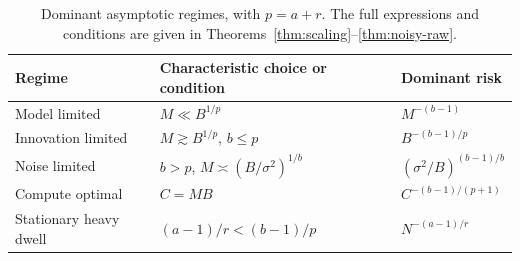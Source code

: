 \begin{table}[t]
\centering
\footnotesize
\caption{Dominant asymptotic regimes, with $p=a+r$.  The full expressions and
conditions are given in Theorems~\ref{thm:scaling}--\ref{thm:noisy-raw}.}
\label{tab:regimes}
\setlength{\tabcolsep}{1.5pt}%
\begin{tabular}{@{}lp{}p{}@{}}
\toprule
Regime & Characteristic choice or condition & Dominant risk \\
\midrule
Model limited & $M\ll B^{1/p}$ & $M^{-(b-1)}$ \\
Innovation limited & $M\gtrsim B^{1/p}$, $b\le p$ & $B^{-(b-1)/p}$ \\
Noise limited & $b>p$, $M\asymp(B/\sigma^2)^{1/b}$ & $(\sigma^2/B)^{(b-1)/b}$ \\
Compute optimal & $C=MB$ & $C^{-(b-1)/(p+1)}$ \\
Stationary heavy dwell & $(a-1)/r<(b-1)/p$ & $N^{-(a-1)/r}$ \\
\bottomrule
\end{tabular}
\end{table}
